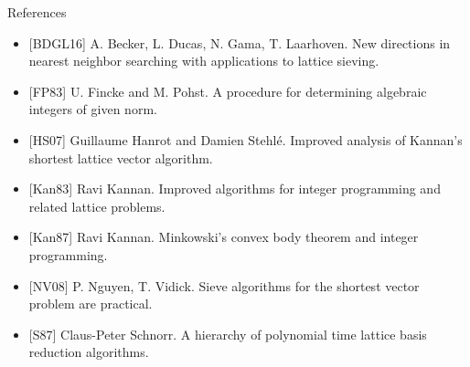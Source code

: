 \documentclass[usenames,dvipsnames, 9pt, aspectratio=169]{beamer}
\begin{document}
\begin{frame}{References}
	\begin{itemize}
		\setlength\itemsep{6pt}
		\item {\color{Orange} [BDGL16]}  A. Becker, L. Ducas, N. Gama, T. Laarhoven. New directions in nearest neighbor searching with applications to lattice sieving.
		\item {\color{Orange} [FP83]} U. Fincke and M. Pohst. A procedure for determining algebraic integers of given norm.
		\item {\color{Orange} [HS07]} Guillaume Hanrot and Damien Stehl{\'e}. Improved analysis of Kannan’s shortest lattice vector algorithm.
		\item {\color{Orange} [Kan83]} Ravi Kannan. Improved algorithms for integer programming and related lattice problems.
		\item {\color{Orange}[Kan87]} Ravi Kannan. Minkowski’s convex body theorem and integer programming. 
		\item {\color{Orange} [NV08]} P. Nguyen, T. Vidick. Sieve algorithms for the shortest vector problem are practical. 
		\item {\color{Orange}[S87]} Claus-Peter Schnorr. A hierarchy of polynomial time lattice basis reduction algorithms.

	\end{itemize}
\end{frame}
\end{document}
